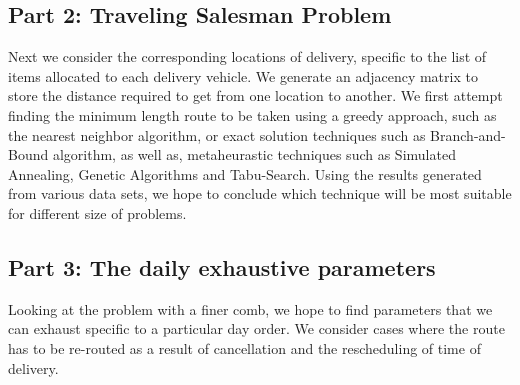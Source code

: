 \subsection{Part 2: Traveling Salesman Problem}
\begin{flushleft}
Next we consider the corresponding locations of delivery, specific to the list of items allocated  to each delivery vehicle. We generate  an adjacency matrix to store the distance required to get from one location to another. We first attempt finding the minimum length route to be taken using a greedy approach, such as the nearest neighbor algorithm, or exact solution techniques such as Branch-and-Bound algorithm, as well as, metaheurastic techniques such as Simulated Annealing, Genetic Algorithms and Tabu-Search. Using the results generated from various data sets, we hope to conclude which technique will be most suitable for different size of problems.  
\end{flushleft}
\subsection{Part 3: The daily exhaustive parameters}
\begin{flushleft}
Looking at the problem with a finer comb, we hope to find parameters that we can exhaust specific to a particular day order. We consider cases where the route has to be re-routed as a result of cancellation and the rescheduling of time of delivery. 
\end{flushleft}
